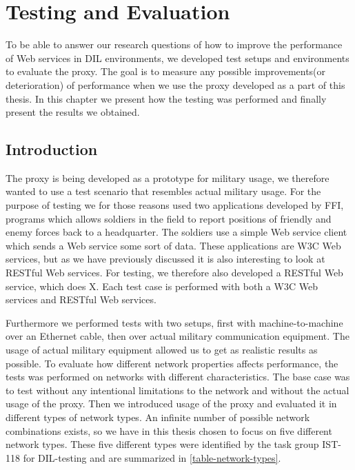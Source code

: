 \chapter{Testing and Evaluation}

To be able to answer our research questions of how to improve the performance of
Web services in DIL environments, we developed test setups and environments to
evaluate the proxy. The goal is to measure any possible improvements(or
deterioration) of performance when we use the proxy developed as a part of
this thesis. In this chapter we present how the testing was performed and
finally present the results we obtained.

\section{Introduction}

The proxy is being developed as a prototype for military usage, we therefore
wanted to use a test scenario that resembles actual military usage. For the
purpose of testing we for those reasons used two applications developed by FFI,
programs which allows soldiers in the field to report positions of friendly and
enemy forces back to a headquarter. The soldiers use a simple Web service client
which sends a Web service some sort of data. These applications are W3C Web
services, but as we have previously discussed it is also interesting to look at
RESTful Web services. For testing, we therefore also developed a RESTful Web
service, which does X. Each test case is performed with both a W3C Web services
and RESTful Web services.

Furthermore we performed tests with two setups, first with machine-to-machine
over an Ethernet cable, then over actual military communication equipment. The
usage of actual military equipment allowed us to get as realistic results as
possible. To evaluate how different network properties affects performance, the
tests was performed on networks with different characteristics. The base case
was to test without any intentional limitations to the network and without the
actual usage of the proxy. Then we introduced usage of the proxy and evaluated
it in different types of network types. An infinite number of possible network
combinations exists, so we have in this thesis chosen to focus on five different
network types. These five different types were identified by the task group
IST-118 for DIL-testing and are summarized in \cref{table-network-types}.

